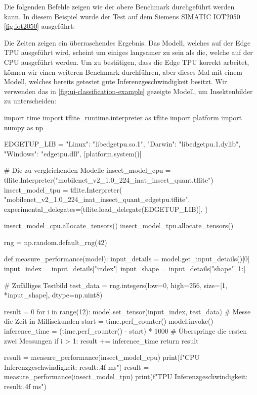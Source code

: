 Die folgenden Befehle zeigen wie der obere Benchmark durchgeführt werden kann.
In diesem Beispiel wurde der Test auf dem Siemens SIMATIC IOT2050 \eqref{fig:iot2050}
ausgeführt:
Die Zeiten zeigen ein überraschendes Ergebnis.
Das Modell, welches auf der Edge TPU ausgeführt wird, scheint um einiges
langsamer zu sein als die, welche auf der CPU ausgeführt werden.
Um zu bestätigen, dass die Edge TPU korrekt arbeitet,
können wir einen weiteren Benchmark durchführen,
aber dieses Mal mit einem Modell, welches bereits
getestet gute Inferenzgeschwindigkeit besitzt. Wir
verwenden das in \autoref{fig:ui-classification-example}
gezeigte Modell, um Insektenbilder zu unterscheiden:
\begin{pythoncode}
import time
import tflite_runtime.interpreter as tflite
import platform
import numpy as np

EDGETUP_LIB = {
    "Linux": "libedgetpu.so.1",
    "Darwin": "libedgetpu.1.dylib",
    "Windows": "edgetpu.dll",
}[platform.system()]

# Die zu vergleichenden Modelle
insect_model_cpu = tflite.Interpreter("mobilenet_v2_1.0_224_inat_insect_quant.tflite")
insect_model_tpu = tflite.Interpreter(
    "mobilenet_v2_1.0_224_inat_insect_quant_edgetpu.tflite",
    experimental_delegates=[tflite.load_delegate(EDGETUP_LIB)],
)

insect_model_cpu.allocate_tensors()
insect_model_tpu.allocate_tensors()

rng = np.random.default_rng(42)

def measure_performance(model):
    input_details = model.get_input_details()[0]
    input_index = input_details["index"]
    input_shape = input_details["shape"][1:]

    # Zufälliges Testbild
    test_data = rng.integers(low=0, high=256, size=[1, *input_shape], dtype=np.uint8)

    result = 0
    for i in range(12):
        model.set_tensor(input_index, test_data)
        # Messe die Zeit in Millisekunden
        start = time.perf_counter()
        model.invoke()
        inference_time = (time.perf_counter() - start) * 1000
        # Überspringe die ersten zwei Messungen
        if i > 1:
            result += inference_time
    return result

result = measure_performance(insect_model_cpu)
print(f"CPU Inferenzgeschwindigkeit: {result:.4f} ms")
result = measure_performance(insect_model_tpu)
print(f"TPU Inferenzgeschwindigkeit: {result:.4f} ms")
\end{pythoncode}
